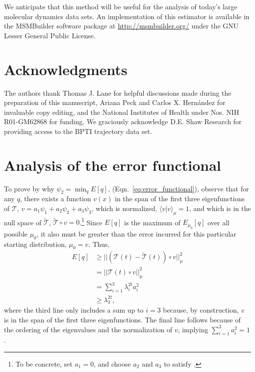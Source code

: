 \documentclass[aip, jcp, reprint, nolinenumbers, twocolumn, nobalancelastpage]{revtex4-1}
\begin{document}
We anticipate that this method will be useful for the analysis of today's large molecular dynamics data sets. An implementation of this estimator is available in the MSMBuilder software package at \url{http://msmbuilder.org/} under the GNU Lesser General Public License.

\section*{Acknowledgments}
The authors thank Thomas J. Lane for helpful discussions made during the preparation of this manuscript, Ariana Peck and Carlos X. Hern\'{a}ndez for invaluable copy editing, and the National Institutes of Health under Nos. NIH R01-GM62868 for funding. We graciously acknowledge D.E. Shaw Research for providing access to the BPTI trajectory data set.

\appendix
\section{Analysis of the error functional}
\label{appendix:error}

To prove by why $\psi_2 = \min_q E[q]$, (Eqn.~\ref{eq:error_functional}), observe that for any $q$, there exists a function $v(x)$ in the span of the first three eigenfunctions of $\mathcal{T}$, $v=a_1 \psi_1+ a_2 \psi_2 + a_3 \psi_3$, which is normalized, $\langle v | v \rangle_\mu = 1$, and which is in the null space of $\tilde{\mathcal{T}}$, $\tilde{\mathcal{T}} \circ v = 0$.\footnote{To be concrete, set $a_1 = 0$, and choose $a_2$ and $a_3$ to satisfy .} Since $E[q]$ is the maximum of $E_{\mu_0}[q]$ over all possible $\mu_0$, it also must be greater than the error incurred for this particular starting distribution, $\mu_0=v$. Thus,
\begin{align}
E[q] &\geq || (\mathcal{T}(t) - \tilde{\mathcal{T}}(t)) \circ v ||_\mu^2 \\
&= || \mathcal{T}(t) \circ v ||_\mu^2 \\
&= \sum_{i=1}^3 \lambda_i^{2t} a_i^2 \\
&\geq \lambda_3^{2t},
\end{align}
where the third line only includes a sum up to $i=3$ because, by construction, $v$ is in the span of the first three eigenfunctions. The final line follows because of the ordering of the eigenvalues and the normalization of $v$, implying $\sum_{i=1}^3 a_i^2 = 1$.
\end{document}
